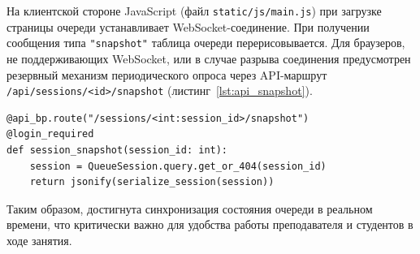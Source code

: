 На клиентской стороне JavaScript (файл \texttt{static/js/main.js}) при загрузке страницы очереди устанавливает WebSocket-соединение. При получении сообщения типа \texttt{"snapshot"} таблица очереди перерисовывается. Для браузеров, не поддерживающих WebSocket, или в случае разрыва соединения предусмотрен резервный механизм периодического опроса через API-маршрут \texttt{/api/sessions/<id>/snapshot} (листинг~\ref{lst:api_snapshot}).

\begin{lstlisting}[caption={REST-совместимый снимок очереди (api.py)}, label={lst:api_snapshot}]
@api_bp.route("/sessions/<int:session_id>/snapshot")
@login_required
def session_snapshot(session_id: int):
    session = QueueSession.query.get_or_404(session_id)
    return jsonify(serialize_session(session))
\end{lstlisting}

Таким образом, достигнута синхронизация состояния очереди в реальном времени, что критически важно для удобства работы преподавателя и студентов в ходе занятия.